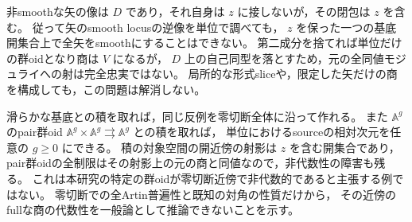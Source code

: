 \begin{remark}[この反例が除外する推論]
非smoothな矢の像は $D$ であり，それ自身は $z$ に接しないが，その閉包は $z$ を含む。
従って矢のsmooth locusの逆像を単位で調べても，
$z$ を保った一つの基底開集合上で全矢をsmoothにすることはできない。
第二成分を捨てれば単位だけの群oidとなり商は $V$ になるが，
$D$ 上の自己同型を落とすため，元の全同値モジュライへの射は完全忠実ではない。
局所的な形式sliceや，限定した矢だけの商を構成しても，この問題は解消しない。

滑らかな基底との積を取れば，同じ反例を零切断全体に沿って作れる。
また $\mathbb A^g$ のpair群oid
$\mathbb A^g\times\mathbb A^g\rightrightarrows\mathbb A^g$ との積を取れば，
単位におけるsourceの相対次元を任意の $g\ge0$ にできる。
積の対象空間の開近傍の射影は $z$ を含む開集合であり，
pair群oidの全制限はその射影上の元の商と同値なので，非代数性の障害も残る。
これは本研究の特定の群oidが零切断近傍で非代数的であると主張する例ではない。
零切断での全Artin普遍性と既知の対角の性質だけから，
その近傍のfullな商の代数性を一般論として推論できないことを示す。
\end{remark}
